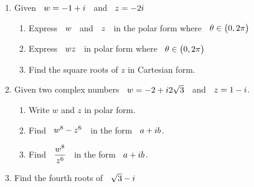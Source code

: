 \documentclass[11pt,a4paper]{article}
\begin{document}
\begin{enumerate}
\item Given $\hspace{0.2cm} w = - 1 + i\hspace{0.2cm}$ and $\hspace{0.2cm} z = -2i$
\begin{enumerate}
      \item Express $\hspace{0.2cm} w\hspace{0.2cm}$ and $\hspace{0.2cm} z\hspace{0.2cm}$ in the polar form where $\hspace{0.2cm} \theta \in \big(0, 2\pi\big)$
      
      \item Express $\hspace{0.2cm}wz\hspace{0.2cm}$ in polar form where $\hspace{0.2cm} \theta \in \big(0, 2\pi\big)$
      
      \item Find the square roots of $z$ in Cartesian form.\\
\end{enumerate}


\item Given two complex numbers $\hspace{0.2cm} w = -2 + i2\sqrt{3}\hspace{0.2cm}$ and $\hspace{0.2cm} z = 1 - i$.
\begin{enumerate}
      \item Write $w$ and $z$ in polar form.
      
      \item Find  $\hspace{0.2cm} w^8  - z^6\hspace{0.2cm}$ in the form $\hspace{0.2cm} a + i b$.
      
      \item Find $\hspace{0.2cm}\dfrac{w^8}{z^6}\hspace{0.2cm}$ in the form $\hspace{0.2cm} a + i b$.\\
\end{enumerate}


\item Find the fourth roots of $\hspace{0.2cm}\sqrt{3} - i$
\end{enumerate}
\end{document}

